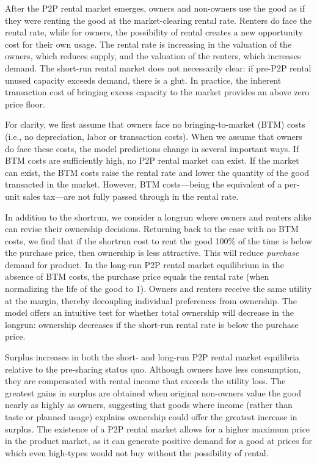 \documentclass[11pt]{article}
\begin{document}
After the P2P rental market emerges, owners and non-owners use the good as if they were renting the good at the market-clearing rental rate. 
Renters do face the rental rate, while for owners, the possibility of rental creates a new opportunity cost for their own usage. 
The rental rate is increasing in the valuation of the owners, which reduces supply, and the valuation of the renters, which increases demand. 
The short-run rental market does not necessarily clear: if pre-P2P rental unused capacity exceeds demand, there is a glut. 
In practice, the inherent transaction cost of bringing excess capacity to the market provides an above zero price floor.

For clarity, we first assume that owners face no bringing-to-market (BTM) costs (i.e., no depreciation, labor or transaction costs).
When we assume that owners do face these costs, the model predictions change in several important ways.
If BTM costs are sufficiently high, no P2P rental market can exist.
If the market can exist, the BTM costs raise the rental rate and lower the quantity of the good transacted in the market.
However, BTM costs---being the equivalent of a per-unit sales tax---are not fully passed through in the rental rate.

In addition to the shortrun, we consider a longrun where owners and renters alike can revise their ownership decisions.
Returning back to the case with no BTM costs, we find that if the shortrun cost to rent the good 100\% of the time is below the purchase price, then ownership is less attractive.
This will reduce \emph{purchase} demand for product.
In the long-run P2P rental market equilibrium in the absence of BTM costs, the purchase price equals the rental rate (when normalizing the life of the good to 1).
Owners and renters receive the same utility at the margin, thereby decoupling individual preferences from ownership. 
The model offers an intuitive test for whether total ownership will decrease in the longrun:
ownership decreases if the short-run rental rate is below the purchase price. 

Surplus increases in both the short- and long-run P2P rental market equilibria relative to the pre-sharing status quo.
Although owners have less consumption, they are compensated with rental income that exceeds the utility loss. 
The greatest gains in surplus are obtained when original non-owners value the good nearly as highly as owners, suggesting that goods where income (rather than taste or planned usage) explains ownership could offer the greatest increase in surplus. 
The existence of a P2P rental market allows for a higher maximum price in the product market, as it can generate positive demand for a good at prices for which even high-types would not buy without the possibility of rental. 
\end{document}
